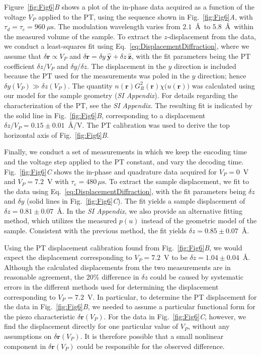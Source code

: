 \documentclass[9pt,twocolumn,twoside,lineno]{pnas-new}
\begin{document}
Figure~\ref{fig:Fig6}\textit{B} shows a plot of the in-phase data acquired as a function of the voltage $V_P$ applied to the PT, using the sequence shown in Fig.~\ref{fig:Fig6}\textit{A}, with $\tau_d=\tau_e = 960~\mu\text{s}$. The modulation wavelength varies from $2.1$~\AA\, to $5.8$~\AA\, within the measured volume of the sample. 
To extract the $z$-displacement from the data, we conduct a least-squares fit \cite{sivia2006} using Eq.~\ref{eq:DisplacementDiffraction}, where we assume that $\delta \mathbf{r}\propto V_P$ and $\delta \mathbf{r} = \delta y~\hat{\mathbf{y}}+\delta z~\hat{\mathbf{z}}$, with the fit parameters being the PT coefficient $\delta z/V_P$ and $\delta y/\delta z$.
The displacement in the $y$ direction is included because the PT used for the measurements was poled in the $y$ direction; hence $\delta y(V_P) \gg \delta z(V_P)$.
The quantity $n(\mathbf{r}) G_R^2(\mathbf{r})\chi\big(u(\mathbf{r})\big)$ was calculated using our model for the sample geometry (\textit{SI Appendix}).
For details regarding the characterization of the PT, see the \textit{SI Appendix}.
The resulting fit is indicated by the solid line in Fig.~\ref{fig:Fig6}\textit{B}, corresponding to a displacement $\delta z/V_P = 0.15\pm 0.01$~\AA/V. The PT calibration was used to derive the top horizontal axis of Fig.~\ref{fig:Fig6}\textit{B}.

Finally, we conduct a set of measurements in which we keep the encoding time and the voltage step applied to the PT constant, and vary the decoding time. Fig.~\ref{fig:Fig6}\textit{C} shows the in-phase and quadrature data acquired for $V_P=0$~V and $V_P=7.2$~V with $\tau_e=480\,\mu\text{s}$.
To extract the sample displacement, we fit to the data using Eq.~\ref{eq:DisplacementDiffraction}, with the fit parameters being $\delta z$ and $\delta y$ (solid lines in Fig.~\ref{fig:Fig6}\textit{C}).
The fit yields a sample displacement of $\delta z = 0.81\pm 0.07$~\AA.
In the \textit{SI Appendix}, we also provide an alternative fitting method, which utilizes the measured $p(u)$ instead of the geometric model of the sample. Consistent with the previous method, the fit yields $\delta z = 0.85\pm 0.07$~\AA.

Using the PT displacement calibration found from Fig.~\ref{fig:Fig6}\textit{B}, we would expect the displacement corresponding to $V_P=7.2$~V to be $\delta z=1.04\pm 0.04$~\AA. Although the calculated displacements from the two measurements are in reasonable agreement, the 20\% difference in $\delta z$ could be caused by systematic errors in the different methods used for determining the displacement corresponding to $V_P=7.2$~V. In particular, to determine the PT displacement for the data in Fig.~\ref{fig:Fig6}\textit{B}, we needed to assume a particular functional form for the piezo characteristic $\delta\mathbf{r}(V_P)$. For the data in Fig.~\ref{fig:Fig6}\textit{C}, however, we find the displacement directly for one particular value of $V_P$, without any assumptions on $\delta\mathbf{r}(V_P)$. It is therefore possible that a small nonlinear component in $\delta\mathbf{r}(V_P)$ could be responsible for the observed difference.
\end{document}
